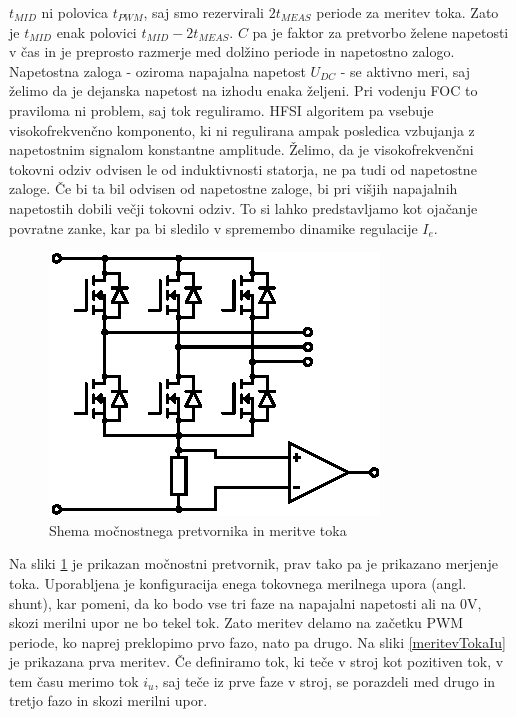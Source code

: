\documentclass[a4paper,twoside,openright,12pt,slovene]{book}
\begin{document}
$t_{MID}$ ni polovica $t_{PWM}$, saj smo rezervirali $2t_{MEAS}$ periode za meritev toka. Zato je $t_{MID}$ enak polovici $t_{MID} - 2t_{MEAS}$. $C$ pa je faktor za pretvorbo želene napetosti v čas
in je preprosto razmerje med dolžino periode in napetostno zalogo. Napetostna zaloga - oziroma napajalna napetost $U_{DC}$ - se aktivno meri, saj želimo da je dejanska napetost na izhodu enaka
željeni. Pri vodenju FOC to praviloma ni problem, saj tok reguliramo. HFSI algoritem pa vsebuje visokofrekvenčno komponento, ki ni regulirana ampak posledica vzbujanja z napetostnim signalom
konstantne amplitude. Želimo, da je visokofrekvenčni tokovni odziv odvisen le od induktivnosti statorja, ne pa tudi od napetostne zaloge. Če bi ta bil odvisen od napetostne zaloge, bi pri višjih
napajalnih napetostih dobili večji tokovni odziv. To si lahko predstavljamo kot ojačanje povratne zanke, kar pa bi sledilo v spremembo dinamike regulacije $I_e$.

\begin{figure}[!htbp]
    \centering
    \includegraphics[width=0.5\columnwidth]{Slike/Inkscape/inverter.eps}
    \caption{\label{inverter} Shema močnostnega pretvornika in meritve toka }
\end{figure}

Na sliki \ref{inverter} je prikazan močnostni pretvornik, prav tako pa je prikazano merjenje toka. Uporabljena je konfiguracija enega tokovnega merilnega upora (angl. shunt), kar pomeni, da ko bodo vse tri faze na napajalni napetosti
ali na 0V, skozi merilni upor ne bo tekel tok. Zato meritev delamo na začetku PWM periode, ko naprej preklopimo prvo fazo, nato pa drugo. Na sliki \ref{meritevTokaIu} je prikazana prva meritev. Če definiramo
tok, ki teče v stroj kot pozitiven tok, v tem času merimo tok $i_u$, saj teče iz prve faze v stroj, se porazdeli med drugo in tretjo fazo in skozi merilni upor. 
\end{document}
